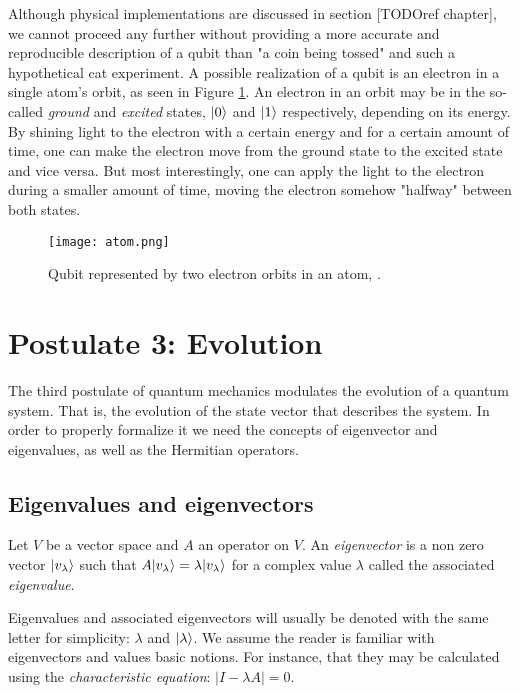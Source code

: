 Although physical implementations are discussed in section [TODOref chapter], we cannot proceed any further without providing a more accurate and reproducible description of a qubit than "a coin being tossed" and such a hypothetical cat experiment. A possible realization of a qubit is an electron in a single atom's orbit, as seen in Figure \ref{fig 1.1}. An electron in an orbit may be in the so-called \emph{ground} and \emph{excited} states, $|0\rangle$ and $|1\rangle$ respectively, depending on its energy. By shining light to the electron with a certain energy and for a certain amount of time, one can make the electron move from the ground state to the excited state and vice versa. But most interestingly, one can apply the light to the electron during a smaller amount of time, moving the electron somehow "halfway" between both states.

\begin{figure}[h]
	\texttt{[image: atom.png]}
	\centering
	\caption{Qubit represented by two electron orbits in an atom, \cite{Nielsen2002}.}
	\label{fig 1.1}
\end{figure}


\section{Postulate 3: Evolution}


The third postulate of quantum mechanics modulates the evolution of a quantum system. That is, the evolution of the state vector that describes the system. In order to properly formalize it we need the concepts of eigenvector and eigenvalues, as well as the Hermitian operators.


\subsection{Eigenvalues and eigenvectors}


\begin{definition}
	Let $V$ be a vector space and $A$ an operator on $V$. An \emph{eigenvector} is a non zero vector $|v_\lambda\rangle$ such that $A|v_\lambda\rangle = \lambda|v_\lambda\rangle$ for a complex value $\lambda$ called the associated \emph{eigenvalue}.
\end{definition}

Eigenvalues and associated eigenvectors will usually be denoted with the same letter for simplicity: $\lambda$ and $|\lambda\rangle$. We assume the reader is familiar with eigenvectors and values basic notions. For instance, that they may be calculated using the \emph{characteristic equation}: $|I - \lambda A| = 0$.

